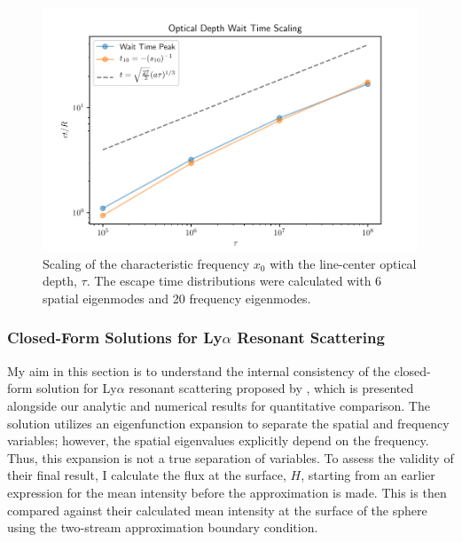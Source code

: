 \documentclass[onecolumn]{aastex63}
\begin{document}
\begin{figure}
    \centering
    \includegraphics[width=\textwidth]{tau_scaling.pdf}
    \caption{Scaling of the characteristic frequency $x_0$ with the line-center optical depth, $\tau$. The escape time distributions were calculated with 6 spatial eigenmodes and 20 frequency eigenmodes.}
    \label{tau_scaling}
\end{figure}




\subsubsection{Closed-Form Solutions for Ly$\alpha$ Resonant Scattering}

My aim in this section is to understand the internal consistency of the closed-form solution for Ly$\alpha$ resonant scattering proposed by \cite{2006ApJ...649...14D}, which is presented alongside our analytic and numerical results for quantitative comparison. The solution utilizes an eigenfunction expansion to separate the spatial and frequency variables; however, the spatial eigenvalues explicitly depend on the frequency. Thus, this expansion is not a true separation of variables. To assess the validity of their final result, I calculate the flux at the surface, $H$, starting from an earlier expression for the mean intensity before the approximation is made. This is then compared against their calculated mean intensity at the surface of the sphere using the two-stream approximation boundary condition.
\end{document}

